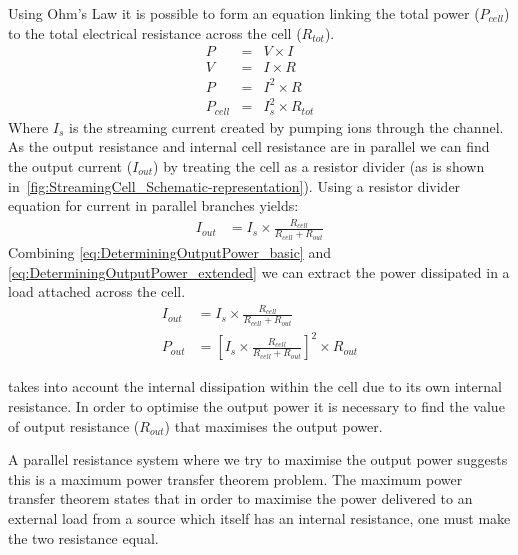       Using Ohm's Law it is possible to form an equation linking the total power ($P_{cell}$) to the total electrical resistance across the cell ($R_{tot}$).
      \begin{align}
          P & = & V\times I\nonumber \\
          V & = & I\times R\nonumber \\
          P & = & I^{2}\times R\nonumber \\
          P_{cell} & = & I_{s}^{2}\times R_{tot}
          \label{eq:DeterminingOutputPower_basic}
      \end{align}
      Where $I_{s}$ is the streaming current created by pumping ions through the channel.
      As the output resistance and internal cell resistance are in parallel we can find the output current ($I_{out}$) by treating the cell as a resistor divider (as is shown in~\cref{fig:StreamingCell_Schematic-representation}).
      Using a resistor divider equation for current in parallel branches yields:
      \begin{align}
          I_{out} & = I_{s}\times\frac{R_{cell}}{R_{cell}+R_{out}}
          \label{eq:DeterminingOutputPower_extended}
      \end{align}
      Combining \cref{eq:DeterminingOutputPower_basic} and \cref{eq:DeterminingOutputPower_extended} we can extract the power dissipated in a load attached across the cell.
      \begin{align}
          I_{out} & = I_{s}\times\frac{R_{cell}}{R_{cell}+R_{out}}\nonumber \\
          P_{out} & = \left[I_{s}\times\frac{R_{cell}}{R_{cell}+R_{out}}\right]^{2}\times R_{out}
          \label{eq:DeterminingOutputPower_result}
      \end{align}

       takes into account the internal dissipation within the cell due to its own internal resistance.
      In order to optimise the output power it is necessary to find the value of output resistance ($R_{out}$) that maximises the output power.

      A parallel resistance system where we try to maximise the output power suggests this is a maximum power transfer theorem problem.
      The maximum power transfer theorem states that in order to maximise the power delivered to an external load from a source which itself has an internal resistance, one must make the two resistance equal.




